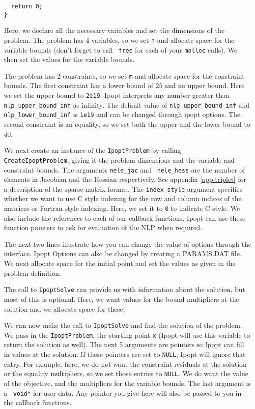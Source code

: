 \documentclass[letter,10pt]{article}
\begin{document}
{\begin{verbatim}
  return 0;
}
\end{verbatim}
Here, we declare all the necessary variables and set the dimensions of
the problem.  The problem has 4 variables, so we set {\tt n} and
allocate space for the variable bounds (don't forget to call {\tt
free} for each of your {\tt malloc} calls). We then set the values for
the variable bounds.  

The problem has 2 constraints, so we set {\tt m}
and allocate space for the constraint bounds. The first constraint has
a lower bound of $25$ and no upper bound.  Here we set the upper bound
to \texttt{2e19}. Ipopt interprets any number greater than \texttt{nlp\_upper\_bound\_inf}
as infinity. The default value of \texttt{nlp\_upper\_bound\_inf} and
\texttt{nlp\_lower\_bound\_inf} is \texttt{1e19} and can be changed through ipopt options.
The second constraint is an equality, so we set both the upper and the 
lower bound to $40$.

We next create an instance of the {\tt IpoptProblem} by calling {\tt
CreateIpoptProblem}, giving it the problem dimensions and the variable
and constraint bounds. The arguments {\tt nele\_jac} and {\tt
nele\_hess} are the number of elements in Jacobian and the Hessian
respectively. See appendix \ref{app.triplet} for a description of the
sparse matrix format. The {\tt index\_style} argument specifies whether
we want to use C style indexing for the row and column indices of the
matrices or Fortran style indexing. Here, we set it to {\tt 0} to
indicate C style.  We also include the references to each of our
callback functions. Ipopt can use these function pointers to ask for
evaluation of the NLP when required.

The next two lines illustrate how you can change the value of options
through the interface.  Ipopt Options can also be changed by creating
a PARAMS.DAT file. We next allocate space for the initial point and
set the values as given in the problem definition.

The call to {\tt IpoptSolve} can provide us with information about the solution,
but most of this is optional. Here, we want values for the bound multipliers at
the solution and we allocate space for these.

We can now make the call to {\tt IpoptSolve} and find the solution of
the problem. We pass in the {\tt IpoptProblem}, the starting point
{\tt x} (Ipopt will use this variable to return the solution as
well). The next 5 arguments are pointers so Ipopt can fill in values
at the solution.  If these pointers are set to {\tt NULL}, Ipopt will
ignore that entry.  For example, here, we do not want the constraint
residuals at the solution or the equality multipliers, so we set those
entries to {\tt NULL}. We do want the value of the objective, and the
multipliers for the variable bounds. The last argument is a {\tt
void*} for user data. Any pointer you give here will also be passed to
you in the callback functions.

}
\end{document}
